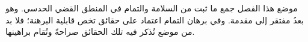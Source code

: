 \documentclass[../../../include/open-logic-chapter]{subfiles}
\begin{document}

\begin{editorial}
  موضع هذا الفصل جمع ما ثبت من السلامة والتمام في المنطق القضي الحدسي.
  وهو بعدُ مفتقر إلى مقدمة. وفي برهان التمام اعتماد على حقائق تخص قابلية
  البرهنة؛ فلا بد من موضع تُذكر فيه تلك الحقائق صراحةً وتُقام براهينها.
\end{editorial}


\OLEndChapterHook
\end{document}
